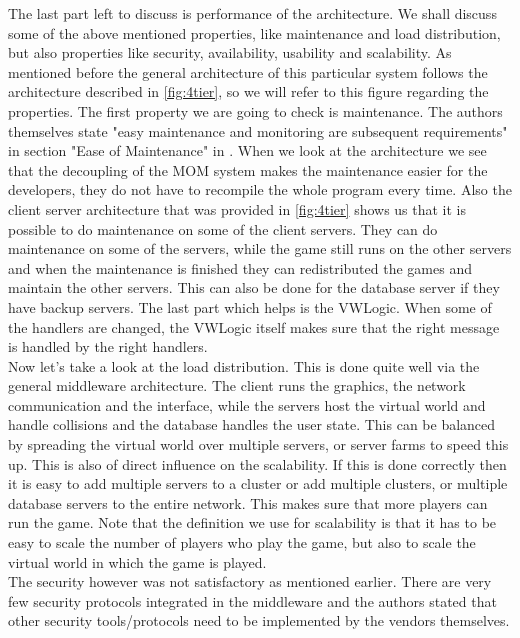 The last part left to discuss is performance of the architecture. 
We shall discuss some of the above mentioned properties, like maintenance and load distribution, but also properties like security, availability, usability and scalability. 
As mentioned before the general architecture of this particular system follows the architecture described in \autoref{fig:4tier}, so we will refer to this figure regarding the properties. 
The first property we are going to check is maintenance. 
The authors themselves state "easy maintenance and monitoring are subsequent requirements" in section "Ease of Maintenance" in \cite{middleware}. 
When we look at the architecture we see that the decoupling of the MOM system makes the maintenance easier for the developers, they do not have to recompile the whole program every time. 
Also the client server architecture that was provided in \autoref{fig:4tier} shows us that it is possible to do maintenance on some of the client servers. 
They can do maintenance on some of the servers, while the game still runs on the other servers and when the maintenance is finished they can redistributed the games and maintain the other servers. 
This can also be done for the database server if they have backup servers. 
The last part which helps is the VWLogic. 
When some of the handlers are changed, the VWLogic itself makes sure that the right message is handled by the right handlers. \\
\indent Now let's take a look at the load distribution. 
This is done quite well via the general middleware architecture. 
The client runs the graphics, the network communication and the interface, while the servers host the virtual world and handle collisions and the database handles the user state. 
This can be balanced by spreading the virtual world over multiple servers, or server farms to speed this up. 
This is also of direct influence on the scalability. 
If this is done correctly then it is easy to add multiple servers to a cluster or add multiple clusters, or multiple database servers to the entire network. 
This makes sure that more players can run the game. 
Note that the definition we use for scalability is that it has to be easy to scale the number of players who play the game, but also to scale the virtual world in which the game is played.\\
\indent The security however was not satisfactory as mentioned earlier. 
There are very few security protocols integrated in the middleware and the authors stated that other security tools/protocols need to be implemented by the vendors themselves. 
